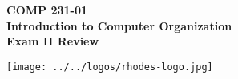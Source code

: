 \documentclass[10pt]{article}
\begin{document}

\hspace{-5mm}
\begin{minipage}{0.65\linewidth}
  \textbf{
      \hspace{-3mm}
      {\Large COMP 231-01}\\
      {\Large Introduction to Computer Organization}\\
      {\Large Exam II Review}}
\end{minipage}
\begin{minipage}{0.35\linewidth}
  \texttt{[image: ../../logos/rhodes-logo.jpg]}
\end{minipage}

\end{document}
